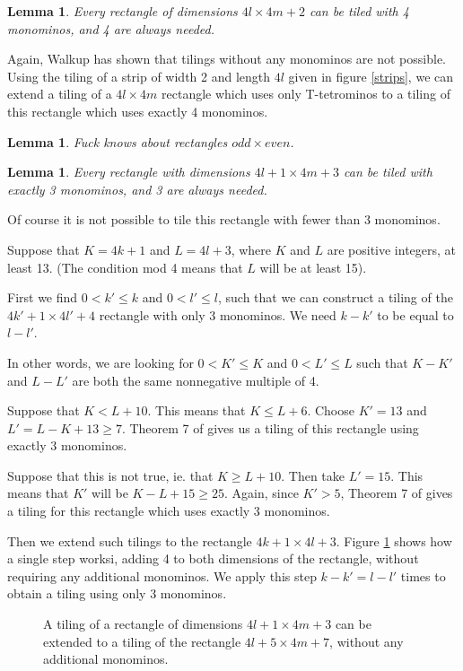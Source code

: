 \documentclass{article}
\theoremstyle{plain}
\newtheorem{lemma}[theorem]{Lemma}
\begin{document}
\begin{lemma}
Every rectangle of dimensions $4l \times 4m + 2$ can be tiled with 4 monominos, and 4 are always needed.
\end{lemma}
Again, Walkup has shown that tilings without any monominos are not possible. Using the tiling of a strip of width 2 and length $4l$ given in figure \ref{strips}, we can extend a tiling of a $4l \times 4m$ rectangle which uses only T-tetrominos to a tiling of this rectangle which uses exactly 4 monominos.

\begin{lemma}
Fuck knows about rectangles $odd \times even$.
\end{lemma}

\begin{lemma}\label{3_times_1}
Every rectangle with dimensions $4l + 1 \times 4m + 3$ can be tiled with exactly 3 monominos, and 3 are always needed.
\end{lemma}
Of course it is not possible to tile this rectangle with fewer than 3 monominos.

Suppose that $K = 4k + 1$ and $L = 4l + 3$, where $K$ and $L$ are positive integers, at least 13. (The condition mod 4 means that $L$ will be at least 15).

First we find $0 < k' \leq k$ and $0 < l' \leq l$, such that we can construct a tiling of the $4k' + 1 \times 4l' + 4$ rectangle with only 3 monominos. We need $k - k'$ to be equal to $l - l'$.

In other words, we are looking for $0 < K' \leq K$ and $0 < L' \leq L$ such that $K - K'$ and $L - L'$ are both the same nonnegative multiple of 4.

Suppose that $K < L + 10$. This means that $K \leq L + 6$. Choose $K' = 13$ and $L' = L - K + 13 \geq 7$. Theorem 7 of \cite{hochberg} gives us a tiling of this rectangle using exactly 3 monominos.

Suppose that this is not true, ie. that $K \geq L + 10$. Then take $L' = 15$. This means that $K'$ will be $K - L + 15 \geq 25$. Again, since $K' > 5$, Theorem 7 of \cite{hochberg} gives a tiling for this rectangle which uses exactly 3 monominos.

Then we extend such tilings to the rectangle $4k + 1 \times 4l + 3$. Figure \ref{extending} shows how a single step worksi, adding 4 to both dimensions of the rectangle, without requiring any additional monominos. We apply this step $k - k' = l - l'$ times to obtain a tiling using only 3 monominos.

\begin{figure}

\caption{A tiling of a rectangle of dimensions $4l + 1 \times 4m + 3$ can be extended to a tiling of the rectangle $4l + 5 \times 4m + 7$, without any additional monominos.}
\label{extending}
\end{figure}


{}

\end{document}

